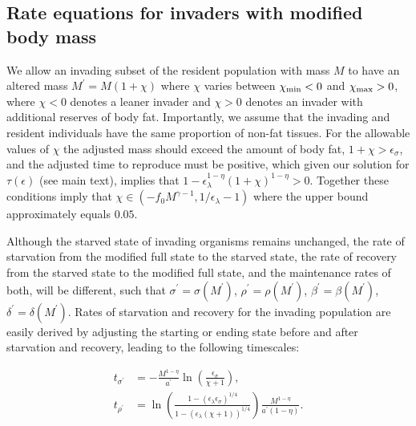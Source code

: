 \documentclass[twocolumn,preprintnumbers,amsmath,amssymb,superscriptaddress]{revtex4}
\begin{document}
\begin{bibunit}[unsrt]
\begin{table}[h]
\begin{center}
\begin{tabular}{ p{1.2cm} p{3.2cm} l p{2.2cm}|}
   \hline
    \end{tabular}
    \end{center}
   \end{table}


\subsection*{Rate equations for invaders with modified body mass}
We allow an invading subset of the resident population with mass $M$ to have an altered mass $M^\prime = M(1+\chi)$ where $\chi$ varies between $\chi_{\rm min} <0$ and $\chi_{\rm max}>0$, where $\chi<0$ denotes a leaner invader and $\chi > 0$ denotes an invader with additional reserves of body fat.
Importantly, we assume that the invading and resident individuals have the same proportion of non-fat tissues.
For the allowable values of $\chi$ the adjusted mass should exceed the amount of body fat, $1+\chi>\epsilon_{\sigma}$, and the adjusted time to reproduce must be positive, which given our solution for $\tau(\epsilon)$ (see main text), implies that $1-\epsilon_{\lambda}^{1-\eta}\left(1+\chi\right)^{1-\eta}>0$.
Together these conditions imply that  $\chi\in(-f_0M^{\gamma-1},1/\epsilon_{\lambda}-1)$ where the upper bound approximately equals $0.05$.

Although the starved state of invading organisms remains unchanged, the rate of starvation from the modified full state to the starved state, the rate of recovery from the starved state to the modified full state, and the maintenance rates of both, will be different, such that $\sigma^\prime = \sigma(M^\prime)$, $\rho^\prime = \rho(M^\prime)$, $\beta^\prime = \beta(M^\prime)$, $\delta^\prime = \delta(M^\prime)$.
Rates of starvation and recovery for the invading population are easily derived by adjusting the starting or ending state before and after starvation and recovery, leading to the following timescales:

\begin{align}
t_{\sigma^\prime} &= -\frac{M^{1-\eta}}{a^{\prime}}\ln \left(\frac{\epsilon_\sigma}{\chi +1}\right), \\ \nonumber
t_{\rho^\prime} &= \ln \left(\frac{1-(\epsilon_\lambda \epsilon_\sigma)^{1/4}}{1-( \epsilon_\lambda(\chi +1))^{1/4}}\right)\frac{M^{1-\eta}}{a^{\prime}\left(1-\eta\right)}.
\end{align}



\end{bibunit}
\end{document}
